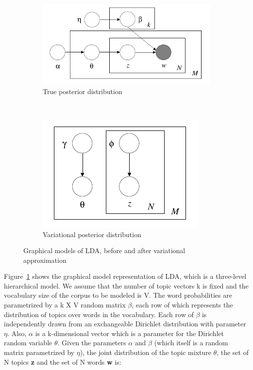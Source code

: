 \documentclass{article} %
\begin{document}
\begin{figure}[ht]
	\centering
	\begin{subfigure}[b]{0.55\textwidth}
	\includegraphics[width=\textwidth]{lda-model.png}
	\caption{True posterior distribution}
	\label{fig:lda-model}
	\end{subfigure}
	~
	\begin{subfigure}[b]{0.4\textwidth}
	\includegraphics[width=\textwidth]{lda-variational.png}
	\caption{Variational posterior distribution}
	\label{fig:lda-variational}
	\end{subfigure}
\caption{Graphical models of LDA, before and after variational approximation}
\label{fig:models}
\end{figure}


Figure~\ref{fig:lda-model} shows the graphical model representation of LDA, which is
a three-level hierarchical model. We
assume that the number of topic vectors k is fixed and the vocabulary size of
the corpus to be modeled is V. The word probabilities are parametrized
by a k X V random matrix $\beta$, each row of which represents the distribution 
of topics over words in the vocabulary. Each row of $\beta$ is independently 
drawn from an exchangeable Dirichlet distribution with parameter $\eta$.
Also, $\alpha$ is a k-dimensional vector 
which is a parameter for the Dirichlet random variable $\theta$. Given the
parameters $\alpha$ and $\beta$ (which itself is a random matrix parametrized
by $\eta$), the joint distribution of the topic mixture
$\theta$, the set of N topics {\bf z} and the set of N words {\bf w} is:
\end{document}
